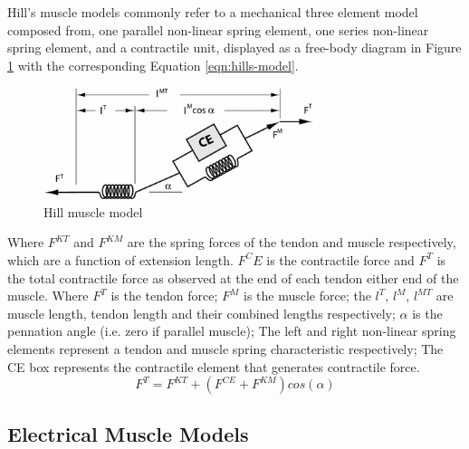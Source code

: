 Hill's muscle models commonly refer to a mechanical three element model \citep{Hill1938} composed from, one parallel non-linear spring element, one series non-linear spring element, and a contractile unit, displayed as a free-body diagram in Figure \ref{fig:hill-model-Muscle} with the corresponding Equation \ref{eqn:hills-model}.
\begin{figure}[H]
  \centering
  \includegraphics[width=8cm]{Figures/hill_type_muscle_model.png}
  \caption{Hill muscle model\citep{Arnold2010}}
  \label{fig:hill-model-Muscle}
\end{figure}
Where $F^{KT}$ and $F^{KM}$ are the spring forces of the tendon and muscle respectively, which are a function of extension length. $F^CE$ is the contractile force and $F^T$ is the total contractile force as observed at the end of each tendon either end of the muscle. Where  $F^T$ is the tendon force; $F^M$ is the muscle force; the $l^T$, $l^M$, $l^{MT}$ are muscle length, tendon length and their combined lengths respectively; $\alpha$ is the pennation angle (i.e. zero if parallel muscle); The left and right non-linear spring elements represent a tendon and muscle spring characteristic respectively; The CE box represents the contractile element that generates contractile force. 
\begin{equation}
    F^T = F^{KT} + (F^{CE} + F^{KM})cos(\alpha)
    \label{eqn:hills-model}
\end{equation}


\subsection{Electrical Muscle Models}

